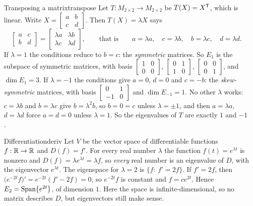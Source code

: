 \documentclass[11pt]{article}
\begin{document}
\begin{exmp}{Transposing a matrix}{transpose}
Let $T:M_{2\times2}\to M_{2\times2}$ be $T(X)=X^{\mathsf T}$, which is linear. Write $X=\begin{bmatrix}a&b\\c&d\end{bmatrix}$. Then $T(X)=\lambda X$ says
\[
\begin{bmatrix}a&c\\b&d\end{bmatrix}=\begin{bmatrix}\lambda a&\lambda b\\\lambda c&\lambda d\end{bmatrix},\qquad\text{that is}\qquad a=\lambda a,\quad c=\lambda b,\quad b=\lambda c,\quad d=\lambda d.
\]
If $\lambda=1$ the conditions reduce to $b=c$: the \emph{symmetric} matrices. So $E_1$ is the subspace of symmetric matrices, with basis $\begin{bmatrix}1&0\\0&0\end{bmatrix}$, $\begin{bmatrix}0&1\\1&0\end{bmatrix}$, $\begin{bmatrix}0&0\\0&1\end{bmatrix}$, and $\dim E_1=3$. If $\lambda=-1$ the conditions give $a=0$, $d=0$ and $c=-b$: the \emph{skew-symmetric} matrices, with basis $\begin{bmatrix}0&1\\-1&0\end{bmatrix}$ and $\dim E_{-1}=1$. No other $\lambda$ works: $c=\lambda b$ and $b=\lambda c$ give $b=\lambda^2b$, so $b=0=c$ unless $\lambda=\pm1$, and then $a=\lambda a$, $d=\lambda d$ force $a=d=0$ unless $\lambda=1$. So the eigenvalues of $T$ are exactly $1$ and $-1$.
\end{exmp}

\begin{exmp}{Differentiation}{deriv}
Let $V$ be the vector space of differentiable functions $f:\mathbb{R}\to\mathbb{R}$ and $D(f)=f'$. For every real number $\lambda$ the function $f(t)=e^{\lambda t}$ is nonzero and $D(f)=\lambda e^{\lambda t}=\lambda f$, so \emph{every} real number is an eigenvalue of $D$, with the eigenvector $e^{\lambda t}$. The eigenspace for $\lambda=2$ is $\{f:\ f'=2f\}$. If $f'=2f$, then $\bigl(e^{-2t}f\bigr)'=e^{-2t}(f'-2f)=0$, so $e^{-2t}f$ is constant and $f=ce^{2t}$. Hence $E_2=\operatorname{Span}\{e^{2t}\}$, of dimension $1$. Here the space is infinite-dimensional, so no matrix describes $D$, but eigenvectors still make sense.
\end{exmp}
\end{document}
